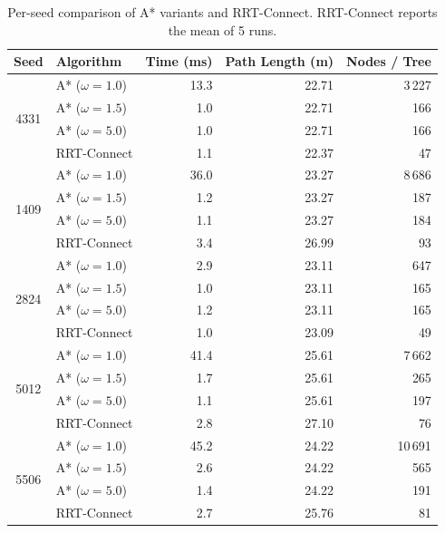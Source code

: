 \documentclass[11pt,a4paper]{article}
\begin{document}
\begin{table}[H]
\centering
\caption{Per-seed comparison of A* variants and RRT-Connect. RRT-Connect reports the mean of 5 runs.}
\label{tab:5seed}
\footnotesize
\begin{tabular}{@{}clrrr@{}}
\toprule
\textbf{Seed} & \textbf{Algorithm} & \textbf{Time (ms)} & \textbf{Path Length (m)} & \textbf{Nodes / Tree} \\
\midrule
\multirow{4}{*}{4331}
 & A* ($\omega\!=\!1.0$) &  13.3 & 22.71 &  3\,227 \\
 & A* ($\omega\!=\!1.5$) &   1.0 & 22.71 &    166 \\
 & A* ($\omega\!=\!5.0$) &   1.0 & 22.71 &    166 \\
 & RRT-Connect           &   1.1 & 22.37 &     47 \\
\midrule
\multirow{4}{*}{1409}
 & A* ($\omega\!=\!1.0$) &  36.0 & 23.27 &  8\,686 \\
 & A* ($\omega\!=\!1.5$) &   1.2 & 23.27 &    187 \\
 & A* ($\omega\!=\!5.0$) &   1.1 & 23.27 &    184 \\
 & RRT-Connect           &   3.4 & 26.99 &     93 \\
\midrule
\multirow{4}{*}{2824}
 & A* ($\omega\!=\!1.0$) &   2.9 & 23.11 &    647 \\
 & A* ($\omega\!=\!1.5$) &   1.0 & 23.11 &    165 \\
 & A* ($\omega\!=\!5.0$) &   1.2 & 23.11 &    165 \\
 & RRT-Connect           &   1.0 & 23.09 &     49 \\
\midrule
\multirow{4}{*}{5012}
 & A* ($\omega\!=\!1.0$) &  41.4 & 25.61 &  7\,662 \\
 & A* ($\omega\!=\!1.5$) &   1.7 & 25.61 &    265 \\
 & A* ($\omega\!=\!5.0$) &   1.1 & 25.61 &    197 \\
 & RRT-Connect           &   2.8 & 27.10 &     76 \\
\midrule
\multirow{4}{*}{5506}
 & A* ($\omega\!=\!1.0$) &  45.2 & 24.22 & 10\,691 \\
 & A* ($\omega\!=\!1.5$) &   2.6 & 24.22 &    565 \\
 & A* ($\omega\!=\!5.0$) &   1.4 & 24.22 &    191 \\
 & RRT-Connect           &   2.7 & 25.76 &     81 \\
\bottomrule
\end{tabular}
\end{table}
\end{document}
